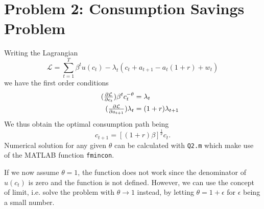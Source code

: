\section{Problem 2: Consumption Savings Problem}
Writing the Lagrangian
\begin{equation*}
	\mathcal L=\sum^T_{t=1}\beta^tu(c_t)-\lambda_t(c_t+a_{t+1}-a_t(1+r)+w_t)
\end{equation*}
we have the first order conditions
\begin{align*}
\tag{$\frac{\partial\mathcal L}{\partial c_t}$}
	\beta^tc_t^{-\theta}&=\lambda_t\\
\tag{$\frac{\partial\mathcal L}{\partial a_{t+1}}$}
	\lambda_t&=(1+r)\lambda_{t+1}\\
\end{align*}
We thus obtain the optimal consumption path being
\begin{equation*}
	c_{t+1}=[(1+r)\beta]^{\frac{1}{\theta}}c_t.
\end{equation*}
Numerical solution for any given $\theta$ can be calculated with \texttt{Q2.m} which make use of the MATLAB function \texttt{fmincon}.

If we now assume $\theta=1$, the function does not work since the denominator of $u(c_t)$ is zero and the function is not defined. However, we can use the concept of limit, i.e. solve the problem with $\theta\to1$ instead, by letting $\theta=1+\epsilon$ for $\epsilon$ being a small number.